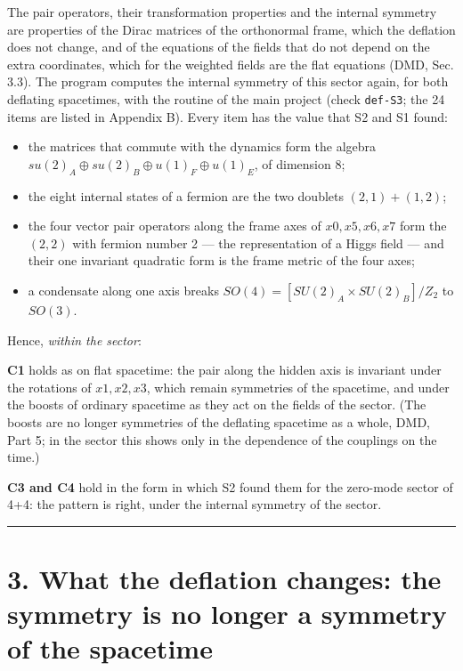 \documentclass[
  10pt,
]{article}
\providecommand{\tightlist}{%
  \setlength{\itemsep}{0pt}\setlength{\parskip}{0pt}}
\begin{document}
The pair operators, their transformation properties and the internal
symmetry are properties of the Dirac matrices of the orthonormal frame,
which the deflation does not change, and of the equations of the fields
that do not depend on the extra coordinates, which for the weighted
fields are the flat equations (DMD, Sec. 3.3). The program computes the
internal symmetry of this sector again, for both deflating spacetimes,
with the routine of the main project (check \texttt{def-S3}; the 24
items are listed in Appendix B). Every item has the value that S2 and S1
found:

\begin{itemize}
\tightlist
\item
  the matrices that commute with the dynamics form the algebra
  \(su(2)_A\oplus su(2)_B\oplus u(1)_F\oplus u(1)_E\), of dimension 8;
\item
  the eight internal states of a fermion are the two doublets
  \((2,1)+(1,2)\);
\item
  the four vector pair operators along the frame axes of \(x0,x5,x6,x7\)
  form the \((2,2)\) with fermion number 2 --- the representation of a
  Higgs field --- and their one invariant quadratic form is the frame
  metric of the four axes;
\item
  a condensate along one axis breaks
  \(SO(4)=[SU(2)_A\times SU(2)_B]/Z_2\) to \(SO(3)\).
\end{itemize}

Hence, \emph{within the sector}:

\textbf{C1} holds as on flat spacetime: the pair along the hidden axis
is invariant under the rotations of \(x1,x2,x3\), which remain
symmetries of the spacetime, and under the boosts of ordinary spacetime
as they act on the fields of the sector. (The boosts are no longer
symmetries of the deflating spacetime as a whole, DMD, Part 5; in the
sector this shows only in the dependence of the couplings on the time.)

\textbf{C3 and C4} hold in the form in which S2 found them for the
zero-mode sector of 4+4: the pattern is right, under the internal
symmetry of the sector.

\begin{center}\rule{0.5\linewidth}{0.5pt}\end{center}

\hypertarget{what-the-deflation-changes-the-symmetry-is-no-longer-a-symmetry-of-the-spacetime}{%
\section{3. What the deflation changes: the symmetry is no longer a
symmetry of the
spacetime}\label{what-the-deflation-changes-the-symmetry-is-no-longer-a-symmetry-of-the-spacetime}}
\end{document}
